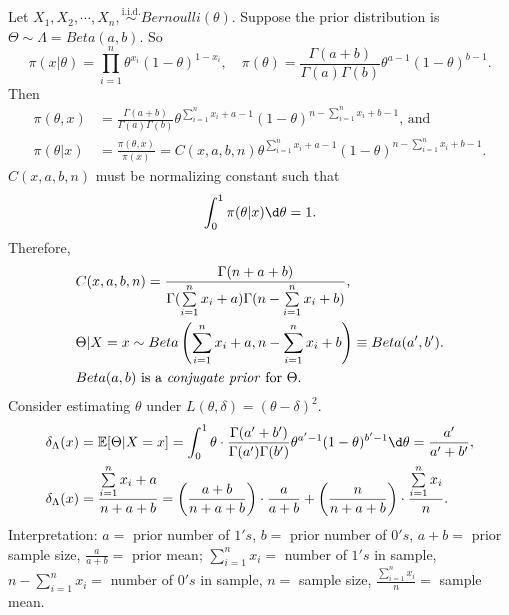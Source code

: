 \documentclass[a4paper]{article}
\begin{document}
\begin{eg}
	Let $X_1,X_2,\cdots,X_n,\stackrel{\text{i.i.d.}}{\sim} Bernoulli(\theta)$. Suppose the prior distribution is $\Theta \sim \Lambda = Beta(a,b)$. So
	\begin{equation*}
			\pi(x|\theta) = \prod_{i=1}^n \theta ^{x_i}(1-\theta)^{1-x_i}, \quad
			\pi(\theta) = \frac{\Gamma(a+b)}{\Gamma(a)\Gamma(b)} \theta^{a-1} (1-\theta)^{b-1}.
	\end{equation*}
	Then
	\begin{equation*}
		\begin{aligned}
			\pi (\theta,x) &= \frac{\Gamma(a+b)}{\Gamma(a)\Gamma(b)} \theta^{\sum\limits_{i=1}^n x_i + a - 1} (1-\theta)^{n - \sum\limits_{i=1}^n x_i + b - 1} \text{, and } \\
			\pi(\theta|x) &= \frac{\pi (\theta,x)}{\pi (x)} = C(x,a,b,n) \theta^{\sum\limits_{i=1}^n x_i + a - 1} (1-\theta)^{n - \sum\limits_{i=1}^n x_i + b - 1}.
		\end{aligned}
	\end{equation*}
	$C(x,a,b,n)$ must be normalizing constant such that
	\begin{equation*}
		\int_{0}^1 \pi (\theta | x) \d \theta = 1.
	\end{equation*}
	Therefore,
	\begin{equation*}
		\begin{aligned}
			& C(x,a,b,n) = \frac{\Gamma(n+a+b)}{\Gamma(\sum\limits_{i=1}^n x_i + a)\Gamma(n - \sum\limits_{i=1}^n x_i + b)}, \\
			& \Theta|X=x \sim Beta\left(\sum\limits_{i=1}^n x_i + a,n - \sum\limits_{i=1}^n x_i + b\right) \equiv Beta(a',b'). \\
			& \text{$Beta(a,b)$ is a \emph{conjugate prior} for $\Theta$.}
		\end{aligned}
	\end{equation*}
	Consider estimating $\theta$ under $L(\theta,\delta) = (\theta - \delta)^2$.
	\begin{equation}
		\begin{aligned}
			& \delta_{\Lambda}(x) = \mathbb{E}[\Theta|X=x] = \int_{0}^1 \theta \cdot \frac{\Gamma(a'+b')}{\Gamma(a')\Gamma(b')} \theta^{a'-1}(1 - \theta)^{b'-1} \d \theta = \frac{a'}{a'+b'}, \\
			& \delta_{\Lambda}(x) = \frac{\sum\limits_{i=1}^n x_i + a}{n + a + b} = \left(\frac{a + b}{n + a + b}\right) \cdot \frac{a}{a + b} + \left(\frac{n}{n + a + b}\right) \cdot \frac{\sum\limits_{i=1}^n x_i}{n}. \\
		\end{aligned}
	\end{equation}
	Interpretation: $a = $ prior number of $1's$, $b = $ prior number of $0's$, $a + b = $ prior sample size, $\frac{a}{a + b} = $ prior mean;  $\sum\limits_{i=1}^n x_i = $ number of $1's$ in sample, $n - \sum\limits_{i=1}^n x_i = $ number of $0's$ in sample, $n = $ sample size, $\frac{\sum\limits_{i=1}^n x_i}{n} = $ sample mean.\\
	

\end{eg}
\end{document}
